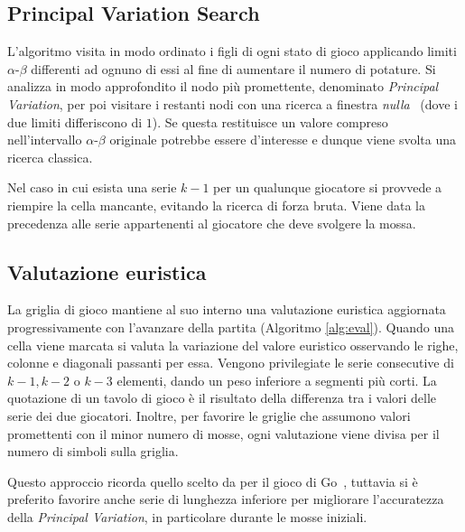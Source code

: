 \documentclass{article}
\begin{document}
\subsection*{Principal Variation Search}

L'algoritmo visita in modo ordinato i figli di ogni stato di gioco applicando
limiti $\alpha$-$\beta$ differenti ad ognuno di essi al fine di aumentare il numero di potature.
Si analizza in modo approfondito il nodo pi\`u promettente, denominato \emph{Principal
Variation}, per poi visitare i restanti nodi con una ricerca a finestra \emph{nulla}~\cite{scout}
(dove i due limiti differiscono di $1$). Se questa restituisce un valore compreso
nell'intervallo $\alpha$-$\beta$ originale potrebbe essere d'interesse e dunque viene
svolta una ricerca classica.

Nel caso in cui esista una serie $k-1$ per un qualunque giocatore si provvede a
riempire la cella mancante, evitando la ricerca di forza bruta. Viene data la
precedenza alle serie appartenenti al giocatore che deve svolgere la mossa.

\subsection*{Valutazione euristica}

La griglia di gioco mantiene al suo interno una valutazione euristica 
aggiornata progressivamente con l'avanzare della partita (Algoritmo \vref{alg:eval}).
Quando una cella viene marcata si valuta la variazione del valore euristico osservando
le righe, colonne e diagonali passanti per essa. Vengono privilegiate le serie consecutive 
di $k-1, k-2$ o $k-3$ elementi, dando un peso inferiore a segmenti pi\`u corti.
La quotazione di un tavolo di gioco \`e il risultato della differenza tra i
valori delle serie dei due giocatori. Inoltre, per favorire le griglie che
assumono valori promettenti con il minor numero di mosse, ogni
valutazione viene divisa per il numero di simboli sulla griglia.

Questo approccio ricorda quello scelto da \citeauthor{chuan} per il gioco di Go~\cite{chuan},
tuttavia si \`e preferito favorire anche serie di lunghezza inferiore per migliorare 
l'accuratezza della \emph{Principal Variation}, in particolare durante le mosse iniziali.
\end{document}
